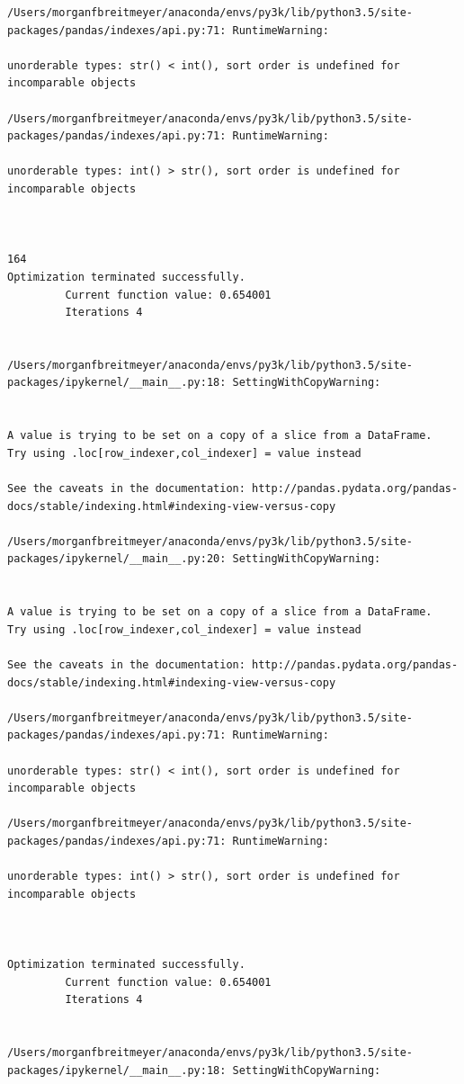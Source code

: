 \begin{lstlisting}
/Users/morganfbreitmeyer/anaconda/envs/py3k/lib/python3.5/site-packages/pandas/indexes/api.py:71: RuntimeWarning:

unorderable types: str() < int(), sort order is undefined for incomparable objects

/Users/morganfbreitmeyer/anaconda/envs/py3k/lib/python3.5/site-packages/pandas/indexes/api.py:71: RuntimeWarning:

unorderable types: int() > str(), sort order is undefined for incomparable objects



164
Optimization terminated successfully.
         Current function value: 0.654001
         Iterations 4


/Users/morganfbreitmeyer/anaconda/envs/py3k/lib/python3.5/site-packages/ipykernel/__main__.py:18: SettingWithCopyWarning:


A value is trying to be set on a copy of a slice from a DataFrame.
Try using .loc[row_indexer,col_indexer] = value instead

See the caveats in the documentation: http://pandas.pydata.org/pandas-docs/stable/indexing.html#indexing-view-versus-copy

/Users/morganfbreitmeyer/anaconda/envs/py3k/lib/python3.5/site-packages/ipykernel/__main__.py:20: SettingWithCopyWarning:


A value is trying to be set on a copy of a slice from a DataFrame.
Try using .loc[row_indexer,col_indexer] = value instead

See the caveats in the documentation: http://pandas.pydata.org/pandas-docs/stable/indexing.html#indexing-view-versus-copy

/Users/morganfbreitmeyer/anaconda/envs/py3k/lib/python3.5/site-packages/pandas/indexes/api.py:71: RuntimeWarning:

unorderable types: str() < int(), sort order is undefined for incomparable objects

/Users/morganfbreitmeyer/anaconda/envs/py3k/lib/python3.5/site-packages/pandas/indexes/api.py:71: RuntimeWarning:

unorderable types: int() > str(), sort order is undefined for incomparable objects



Optimization terminated successfully.
         Current function value: 0.654001
         Iterations 4


/Users/morganfbreitmeyer/anaconda/envs/py3k/lib/python3.5/site-packages/ipykernel/__main__.py:18: SettingWithCopyWarning:



\end{lstlisting}
